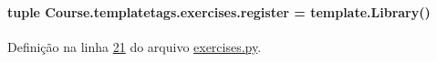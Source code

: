 \paragraph[{register}]{\setlength{\rightskip}{0pt plus 5cm}tuple Course.\+templatetags.\+exercises.\+register = template.\+Library()}\label{namespaceCourse_1_1templatetags_1_1exercises_a69bf3f5149bab102a018136707f13e10}


Definição na linha \hyperlink{exercises_8py_source_l00021}{21} do arquivo \hyperlink{exercises_8py_source}{exercises.\+py}.


